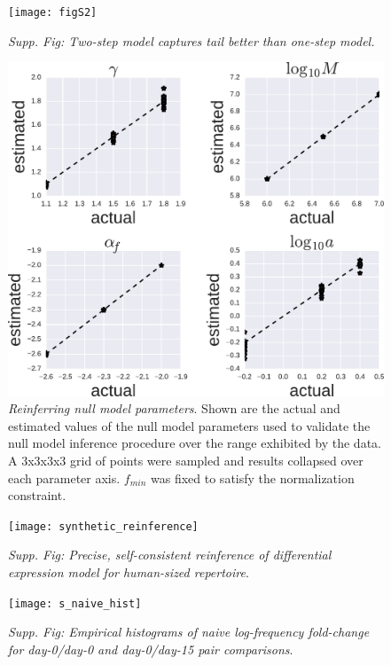 \documentclass[letterpaper,english,prl,reprint,longbibliography]{revtex4-1} %
\begin{document}
\begin{figure}[ht!]
\texttt{[image: figS2]}
\centering{}
\caption{
\emph{Supp. Fig: Two-step model captures tail better than one-step model.\label{fig:SM_twostep_better}}}
\end{figure}

\begin{figure}[ht!]
\includegraphics[width=\linewidth]{NB_Pois_nullpara_fits}
\centering{}
\caption{
\emph{Reinferring null model parameters}. Shown are the actual and estimated values of the null model parameters used to validate the null model inference procedure over the range exhibited by the data. A 3x3x3x3 grid of points were sampled and results collapsed over each parameter axis. $f_{min}$ was fixed to satisfy the normalization constraint.
\label{fig:SM_reinfer_null}}
\end{figure}

\begin{figure}[ht!]
\texttt{[image: synthetic\_reinference]}
\centering{}
\caption{
\emph{Supp. Fig: Precise, self-consistent reinference of differential expression model for human-sized repertoire}.
\label{fig:SM_reinf_diffexpr}}
\end{figure}

\begin{figure}[ht!]
\texttt{[image: s\_naive\_hist]}
\centering{}
\caption{
\emph{Supp. Fig: Empirical histograms of naive log-frequency fold-change for day-0/day-0 and day-0/day-15 pair comparisons}.
\label{fig:SM_snaive_hists}}
\end{figure}
\end{document}
